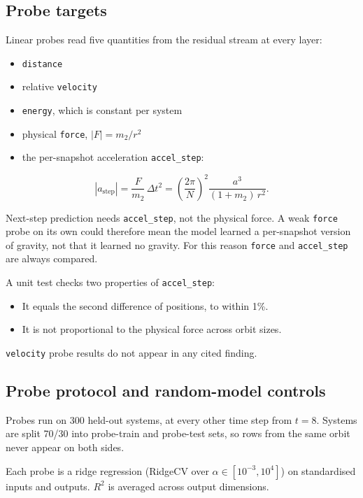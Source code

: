 \documentclass{article}
\begin{document}
\subsection{Probe targets}

Linear probes read five quantities from the residual stream at every layer:

\begin{itemize}
\item \texttt{distance}
\item relative \texttt{velocity}
\item \texttt{energy}, which is constant per system
\item physical \texttt{force}, $|F| = m_2/r^2$
\item the per-snapshot acceleration \texttt{accel\_step}:
\end{itemize}

\[|a_{\text{step}}| = \frac{F}{m_2}\,\Delta t^2 = \left(\frac{2\pi}{N}\right)^2 \frac{a^3}{(1+m_2)\,r^2}.\]

Next-step prediction needs \texttt{accel\_step}, not the physical force. A weak \texttt{force} probe on its own could therefore mean the model learned a per-snapshot version of gravity, not that it learned no gravity. For this reason \texttt{force} and \texttt{accel\_step} are always compared.

A unit test checks two properties of \texttt{accel\_step}:

\begin{itemize}
\item It equals the second difference of positions, to within 1\%.
\item It is not proportional to the physical force across orbit sizes.
\end{itemize}

\texttt{velocity} probe results do not appear in any cited finding.

\subsection{Probe protocol and random-model controls}

Probes run on 300 held-out systems, at every other time step from $t = 8$. Systems are split 70/30 into probe-train and probe-test sets, so rows from the same orbit never appear on both sides.

Each probe is a ridge regression (RidgeCV over $\alpha \in [10^{-3}, 10^{4}]$) on standardised inputs and outputs. $R^2$ is averaged across output dimensions.
\end{document}
